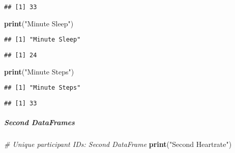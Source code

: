 \documentclass[
]{article}
\newenvironment{Shaded}{\begin{snugshade}}{\end{snugshade}}
\newcommand{\CommentTok}[1]{\textcolor[rgb]{0.56,0.35,0.01}{\textit{#1}}}
\newcommand{\FunctionTok}[1]{\textcolor[rgb]{0.13,0.29,0.53}{\textbf{#1}}}
\newcommand{\NormalTok}[1]{#1}
\newcommand{\SpecialCharTok}[1]{\textcolor[rgb]{0.81,0.36,0.00}{\textbf{#1}}}
\newcommand{\StringTok}[1]{\textcolor[rgb]{0.31,0.60,0.02}{#1}}
\begin{document}
\begin{verbatim}
## [1] 33
\end{verbatim}

\begin{Shaded}
\begin{Highlighting}[]
\FunctionTok{print}\NormalTok{(}\StringTok{"Minute Sleep"}\NormalTok{)}
\end{Highlighting}
\end{Shaded}

\begin{verbatim}
## [1] "Minute Sleep"
\end{verbatim}

\begin{Shaded}
\end{Shaded}

\begin{verbatim}
## [1] 24
\end{verbatim}

\begin{Shaded}
\begin{Highlighting}[]
\FunctionTok{print}\NormalTok{(}\StringTok{"Minute Steps"}\NormalTok{)}
\end{Highlighting}
\end{Shaded}

\begin{verbatim}
## [1] "Minute Steps"
\end{verbatim}

\begin{Shaded}
\end{Shaded}

\begin{verbatim}
## [1] 33
\end{verbatim}

\hypertarget{second-dataframes-1}{%
\subparagraph{Second DataFrames}\label{second-dataframes-1}}

\begin{Shaded}
\begin{Highlighting}[]
\CommentTok{\# Unique participant IDs: Second DataFrame}
\FunctionTok{print}\NormalTok{(}\StringTok{"Second Heartrate"}\NormalTok{)}
\end{Highlighting}
\end{Shaded}
\end{document}
